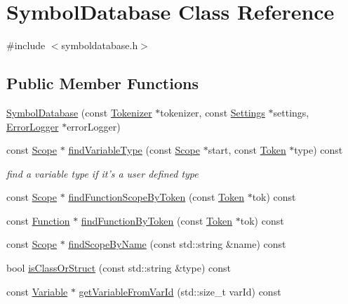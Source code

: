 \hypertarget{class_symbol_database}{\section{Symbol\-Database Class Reference}
\label{class_symbol_database}
}


{\ttfamily \#include $<$symboldatabase.\-h$>$}

\subsection*{Public Member Functions}
\begin{DoxyCompactItemize}
\item 
\hyperlink{class_symbol_database_a49c0ed07b100ca46f2df82ef8ea01cba}{Symbol\-Database} (const \hyperlink{class_tokenizer}{Tokenizer} $\ast$tokenizer, const \hyperlink{class_settings}{Settings} $\ast$settings, \hyperlink{class_error_logger}{Error\-Logger} $\ast$error\-Logger)
\item 
const \hyperlink{class_scope}{Scope} $\ast$ \hyperlink{class_symbol_database_ac8b8080fdce8bd500f7e4c753a275b83}{find\-Variable\-Type} (const \hyperlink{class_scope}{Scope} $\ast$start, const \hyperlink{class_token}{Token} $\ast$type) const 
\begin{DoxyCompactList}\small\item\em find a variable type if it's a user defined type \end{DoxyCompactList}\item 
const \hyperlink{class_scope}{Scope} $\ast$ \hyperlink{class_symbol_database_a98197ea09694115eb8d8b80ef0a17e7d}{find\-Function\-Scope\-By\-Token} (const \hyperlink{class_token}{Token} $\ast$tok) const 
\item 
const \hyperlink{class_function}{Function} $\ast$ \hyperlink{class_symbol_database_af3a28bdb68a9484c9c6801cbd87f6b60}{find\-Function\-By\-Token} (const \hyperlink{class_token}{Token} $\ast$tok) const 
\item 
const \hyperlink{class_scope}{Scope} $\ast$ \hyperlink{class_symbol_database_a2940dcd259ae40c34e16a3e5d53f2155}{find\-Scope\-By\-Name} (const std\-::string \&name) const 
\item 
bool \hyperlink{class_symbol_database_adedac3b072c6687650c7c00a19476bf4}{is\-Class\-Or\-Struct} (const std\-::string \&type) const 
\item 
const \hyperlink{class_variable}{Variable} $\ast$ \hyperlink{class_symbol_database_ab10a436fa040353054ddb20c91655066}{get\-Variable\-From\-Var\-Id} (std\-::size\-\_\-t var\-Id) const 

\end{DoxyCompactItemize}
